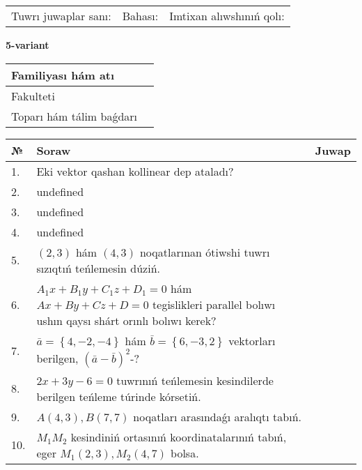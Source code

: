 \documentclass{article}
\begin{document}
\vspace{0.7cm}

\begin{tabular}{lll}
Tuwrı juwaplar sanı: \underline{\hspace{1cm}} & 
Bahası: \underline{\hspace{1cm}} & 
Imtixan alıwshınıń qolı: \underline{\hspace{2cm}} \\
\end{tabular}

\egroup

\newpage


\textbf{5-variant}\\

\bgroup
\def\arraystretch{1.6} %

\begin{tabular}{|m{5.7cm}|m{9.5cm}|}
\hline
Familiyası hám atı & \\
\hline
Fakulteti  & \\
\hline
Toparı hám tálim baǵdarı  & \\
\hline
\end{tabular}

\vspace{0.7cm}

\begin{tabular}{|m{0.7cm}|m{10cm}|m{4cm}|}
\hline
№ & Soraw & Juwap \\
\hline
1. & Eki vektor qashan kollinear dep ataladı? &  \\
\hline
2. & undefined &  \\
\hline
3. & undefined &  \\
\hline
4. & undefined &  \\
\hline
5. & $(2, 3)$ hám $(4, 3)$ noqatlarınan ótiwshi tuwrı sızıqtıń teńlemesin dúziń. &  \\
\hline
6. & \(A_{1}x + B_{1}y + C_{1}z + D_{1} = 0\) hám \(Ax + By + Cz + D = 0\) tegislikleri parallel bolıwı ushın qaysı shárt orınlı bolıwı kerek? &  \\
\hline
7. & \(\bar{a} = \left\{ 4,- 2,- 4 \right\}\) hám \(\bar{b} = \left\{ 6,- 3, 2 \right\}\) vektorları berilgen, \((\bar{a} - \bar{b}) ^{2}\)-? &  \\
\hline
8. & \(2 x + 3 y - 6 = 0\) tuwrınıń teńlemesin kesindilerde berilgen teńleme túrinde kórsetiń. &  \\
\hline
9. & \(A (4, 3), B (7, 7)\) noqatları arasındaǵı aralıqtı tabıń. &  \\
\hline
10. & \(M_{1}M_{2}\) kesindiniń ortasınıń koordinatalarınıń tabıń, eger \(M_{1} (2, 3), M_{2} (4, 7)\) bolsa. & \\
\hline
\end{tabular}
\end{document}
